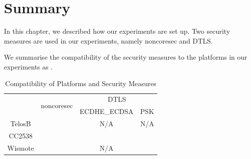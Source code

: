 %
%

\section{Summary}

In this chapter, we described how our experiments are set up. Two security measures are used in our experiments, namely noncoresec and DTLS. 

We summarise the compatibility of the security measures to the platforms in our experiments as .

\begin{table}[h!]
	\center
	\begin{tabular}{|c|c|c|c|}
	\hline
	\multirow{2}{*}{} & \multirow{2}{*}{noncoresec} & \multicolumn{2}{c|}{DTLS} \\ \cline{3-4} 
	                  &                             & ECDHE\_ECDSA & PSK        \\ \hline
	TelosB            & \checkmark                  & N/A          & N/A        \\ \hline
	CC2538            & \checkmark                  & \checkmark   & \checkmark \\ \hline
	Wismote           & \checkmark                  & N/A          & \checkmark \\ \hline
	\end{tabular}
	\caption{Compatibility of Platforms and Security Measures}
	\label{Fig: Compatibility of Platforms and Security Measures}
\end{table}

